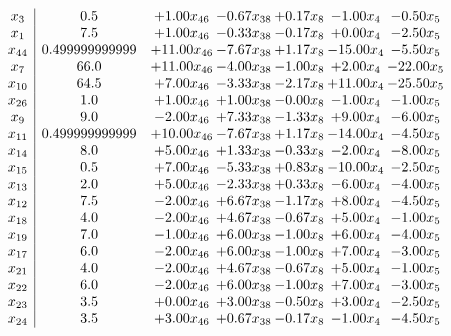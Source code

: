 \documentclass[8pt]{article}
\begin{document}
\[\begin{array}{c| c c@{\hskip 2pt} c@{\hskip 2pt} c@{\hskip 2pt} c@{\hskip 2pt} c@{\hskip 2pt} }
 x_{3}   &  0.5 & +  1.00 x_{46} & -0.67 x_{38} & +  0.17 x_{8} & -1.00 x_{4} & -0.50 x_{5}\\
 x_{1}   &  7.5 & +  1.00 x_{46} & -0.33 x_{38} & -0.17 x_{8} & +  0.00 x_{4} & -2.50 x_{5}\\
 x_{44}   &  0.499999999999 & + 11.00 x_{46} & -7.67 x_{38} & +  1.17 x_{8} & -15.00 x_{4} & -5.50 x_{5}\\
 x_{7}   &  66.0 & + 11.00 x_{46} & -4.00 x_{38} & -1.00 x_{8} & +  2.00 x_{4} & -22.00 x_{5}\\
 x_{10}   &  64.5 & +  7.00 x_{46} & -3.33 x_{38} & -2.17 x_{8} & + 11.00 x_{4} & -25.50 x_{5}\\
 x_{26}   &  1.0 & +  1.00 x_{46} & +  1.00 x_{38} & -0.00 x_{8} & -1.00 x_{4} & -1.00 x_{5}\\
 x_{9}   &  9.0 & -2.00 x_{46} & +  7.33 x_{38} & -1.33 x_{8} & +  9.00 x_{4} & -6.00 x_{5}\\
 x_{11}   &  0.499999999999 & + 10.00 x_{46} & -7.67 x_{38} & +  1.17 x_{8} & -14.00 x_{4} & -4.50 x_{5}\\
 x_{14}   &  8.0 & +  5.00 x_{46} & +  1.33 x_{38} & -0.33 x_{8} & -2.00 x_{4} & -8.00 x_{5}\\
 x_{15}   &  0.5 & +  7.00 x_{46} & -5.33 x_{38} & +  0.83 x_{8} & -10.00 x_{4} & -2.50 x_{5}\\
 x_{13}   &  2.0 & +  5.00 x_{46} & -2.33 x_{38} & +  0.33 x_{8} & -6.00 x_{4} & -4.00 x_{5}\\
 x_{12}   &  7.5 & -2.00 x_{46} & +  6.67 x_{38} & -1.17 x_{8} & +  8.00 x_{4} & -4.50 x_{5}\\
 x_{18}   &  4.0 & -2.00 x_{46} & +  4.67 x_{38} & -0.67 x_{8} & +  5.00 x_{4} & -1.00 x_{5}\\
 x_{19}   &  7.0 & -1.00 x_{46} & +  6.00 x_{38} & -1.00 x_{8} & +  6.00 x_{4} & -4.00 x_{5}\\
 x_{17}   &  6.0 & -2.00 x_{46} & +  6.00 x_{38} & -1.00 x_{8} & +  7.00 x_{4} & -3.00 x_{5}\\
 x_{21}   &  4.0 & -2.00 x_{46} & +  4.67 x_{38} & -0.67 x_{8} & +  5.00 x_{4} & -1.00 x_{5}\\
 x_{22}   &  6.0 & -2.00 x_{46} & +  6.00 x_{38} & -1.00 x_{8} & +  7.00 x_{4} & -3.00 x_{5}\\
 x_{23}   &  3.5 & +  0.00 x_{46} & +  3.00 x_{38} & -0.50 x_{8} & +  3.00 x_{4} & -2.50 x_{5}\\
 x_{24}   &  3.5 & +  3.00 x_{46} & +  0.67 x_{38} & -0.17 x_{8} & -1.00 x_{4} & -4.50 x_{5}\\

\end{array}\]
\end{document}
